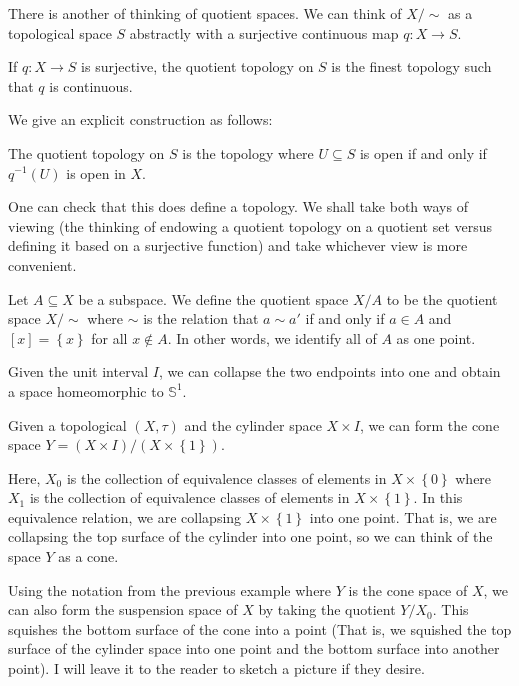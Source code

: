 \documentclass[12pt,reqno]{amsart}
\numberwithin{theorem}{section}
\theoremstyle{definition}
\theoremstyle{remark}
\numberwithin{equation}{section}
\renewcommand{\S}{\mathbb S}
\newcommand{\set}[1]{\left \{ #1 \right \}}
\theoremstyle{definition}
\begin{document}
There is another of thinking of quotient spaces. We can think of $X/\sim$ as a topological space $S$ abstractly with a surjective continuous map $q:X\rightarrow S$. 
\begin{definition}
    If $q:X\rightarrow S$ is surjective, the quotient topology on $S$ is the finest topology such that $q$ is continuous.
\end{definition}
We give an explicit construction as follows:
\begin{definition}
    The quotient topology on $S$ is the topology where $U\subseteq S$ is open if and only if $q^{-1}(U)$ is open in $X$.
\end{definition}
One can check that this does define a topology. We shall take both ways of viewing (the thinking of endowing a quotient topology on a quotient set versus defining it based on a surjective function) and take whichever view is more convenient.
\begin{definition}
    Let $A\subseteq X$ be a subspace. We define the quotient space $X/A$ to be the quotient space $X/\sim$ where $\sim$ is the relation that $a \sim a'$ if and only if $a \in A$ and $[x] = \set x$ for all $x \notin A$. In other words, we identify all of $A$ as one point.
\end{definition}
\begin{example}
    Given the unit interval $I$, we can collapse the two endpoints into one and obtain a space homeomorphic to $\S^1$.
\end{example}
\begin{example}
    Given a topological $(X,\tau)$ and the cylinder space $X \times I$, we can form the cone space $Y=(X \times I)/(X\times \set{1})$.

    \begin{center}
    \end{center}
    Here, $X_0$ is the collection of equivalence classes of elements in $X\times \set 0$ where $X_1$ is the collection of equivalence classes of elements in $X\times \set 1$. In this equivalence relation, we are collapsing $X\times \set 1$ into one point. That is, we are collapsing the top surface of the cylinder into one point, so we can think of the space $Y$ as a cone.
\end{example}
\begin{example}
    Using the notation from the previous example where $Y$ is the cone space of $X$, we can also form the suspension space of $X$ by taking the quotient $Y/X_0$. This squishes the bottom surface of the cone into a point (That is, we squished the top surface of the cylinder space into one point and the bottom surface into another point). I will leave it to the reader to sketch a picture if they desire.
\end{example}
\end{document}
